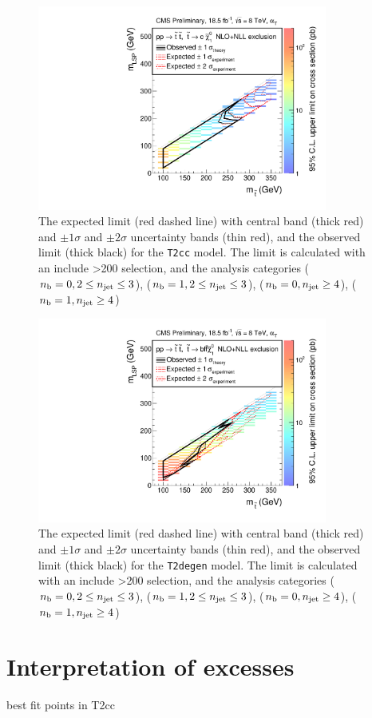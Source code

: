 \begin{figure}[h!]
\centering
\includegraphics[width=0.85\textwidth]{Figs/sms/t2cc/limit_v0/T2cc_toys_XSEC.pdf}
\caption{The expected limit (red dashed line) with central band (thick red)
and $\pm1\sigma$ and $\pm2\sigma$ uncertainty bands (thin red), and the
observed limit (thick black) for the \texttt{T2cc} model. The limit is
calculated with an include \HT>200 \gev selection, and the analysis categories 
($n_{\text{b}} = 0, 2\leq n_{\text{jet}}\leq3$), ($n_{\text{b}} = 1, 2\leq n_{\text{jet}}\leq3$), ($n_{\text{b}} = 0, n_{\text{jet}} \geq 4$), ($n_{\text{b}} = 1,
n_{\text{jet}} \geq 4$)}
\label {fig:t2cc_limit}
\end{figure}

\begin{figure}[h!]
\centering
\includegraphics[width=0.85\textwidth]{Figs/sms/t2degen/limit_v0/T2degen_toys_XSEC.pdf}
\caption{The expected limit (red dashed line) with central band (thick red)
and $\pm1\sigma$ and $\pm2\sigma$ uncertainty bands (thin red), and the
observed limit (thick black) for the \texttt{T2degen} model. The limit is
calculated with an include \HT>200 \gev selection, and the analysis categories 
($n_{\text{b}} = 0, 2\leq n_{\text{jet}}\leq3$), ($n_{\text{b}} = 1, 2\leq n_{\text{jet}}\leq3$), ($n_{\text{b}} = 0, n_{\text{jet}} \geq 4$), ($n_{\text{b}} = 1,
n_{\text{jet}} \geq 4$)}
\label{fig:t2degen_limit}
\end{figure}

\section{Interpretation of excesses}
\label{sec:interpretation_excess}
best fit points in T2cc